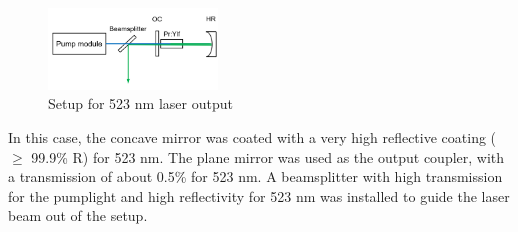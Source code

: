 \documentclass[conference]{IEEEtran}
\begin{document}
\begin{figure}[h]
	\centering
	\includegraphics[width=0.4\textwidth]{img/setup523}
	\caption{Setup for 523 nm laser output}
	\label{setup523}
\end{figure}
In this case, the concave mirror was coated with a very high reflective coating ($\geq$ 99.9\% R) for 523 nm. The plane mirror was used as the output coupler, with a transmission of about 0.5\% for 523 nm. A beamsplitter with high transmission for the pumplight and high reflectivity for 523 nm was installed to guide the laser beam out of the setup. 
\end{document}
